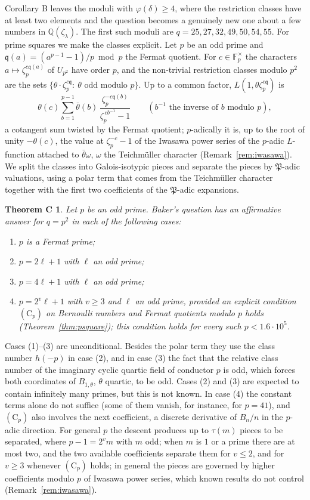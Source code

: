 \documentclass[11pt]{amsart}
\newtheorem*{mainC}{Theorem C}
\theoremstyle{definition}
\theoremstyle{remark}
\providecommand{\Q}{\mathbb Q}
\providecommand{\F}{\mathbb F}
\newcommand{\fq}{\mathfrak q}
\newcommand{\fP}{\mathfrak P}
\numberwithin{equation}{section}
\begin{document}
Corollary B leaves the moduli with $\varphi(\delta)\ge4$, where the restriction classes have at least two elements and the question becomes a genuinely new one about a few numbers in $\Q(\zeta_\lambda)$.
The first such moduli are $q=25,27,32,49,50,54,55$.
For prime squares we make the classes explicit.
Let $p$ be an odd prime and $\fq(a)=(a^{p-1}-1)/p\bmod p$ the Fermat quotient.
For $c\in\F_p^\times$ the characters $a\mapsto\zeta_p^{c\fq(a)}$ of $U_{p^2}$ have order $p$, and the non-trivial restriction classes modulo $p^2$ are the sets $\{\theta\cdot\zeta_p^{c\fq}:\ \theta \text{ odd modulo } p\}$.
Up to a common factor, $L(1,\theta\zeta_p^{c\fq})$ is
\[
\theta(c)\sum_{b=1}^{p-1}\bar\theta(b)\,\frac{\zeta_p^{-c\fq(b)}}{\zeta_p^{\,c b^{-1}}-1}\qquad(b^{-1}\text{ the inverse of $b$ modulo $p$}),
\]
a cotangent sum twisted by the Fermat quotient; $p$-adically it is, up to the root of unity $-\theta(c)$, the value at $\zeta_p^{-c}-1$ of the Iwasawa power series of the $p$-adic $L$-function attached to $\bar\theta\omega$, $\omega$ the Teichm\"uller character (Remark~\ref{rem:iwasawa}).
We split the classes into Galois-isotypic pieces and separate the pieces by $\fP$-adic valuations, using a polar term that comes from the Teichm\"uller character together with the first two coefficients of the $\fP$-adic expansions.

\begin{mainC}
Let $p$ be an odd prime. Baker's question has an affirmative answer for $q=p^2$ in each of the following cases:
\begin{enumerate}
\item $p$ is a Fermat prime;
\item $p=2\ell+1$ with $\ell$ an odd prime;
\item $p=4\ell+1$ with $\ell$ an odd prime;
\item $p=2^v\ell+1$ with $v\ge3$ and $\ell$ an odd prime, provided an explicit condition $(\mathrm C_p)$ on Bernoulli numbers and Fermat quotients modulo $p$ holds (Theorem~\ref{thm:psquare}); this condition holds for every such $p<1.6\cdot10^5$.
\end{enumerate}
\end{mainC}

Cases (1)--(3) are unconditional.
Besides the polar term they use the class number $h(-p)$ in case (2), and in case (3) the fact that the relative class number of the imaginary cyclic quartic field of conductor $p$ is odd, which forces both coordinates of $B_{1,\theta}$, $\theta$ quartic, to be odd.
Cases (2) and (3) are expected to contain infinitely many primes, but this is not known.
In case (4) the constant terms alone do not suffice (some of them vanish, for instance, for $p=41$), and $(\mathrm C_p)$ also involves the next coefficient, a discrete derivative of $B_n/n$ in the $p$-adic direction.
For general $p$ the descent produces up to $\tau(m)$ pieces to be separated, where $p-1=2^vm$ with $m$ odd; when $m$ is $1$ or a prime there are at most two, and the two available coefficients separate them for $v\le2$, and for $v\ge3$ whenever $(\mathrm C_p)$ holds; in general the pieces are governed by higher coefficients modulo $p$ of Iwasawa power series, which known results do not control (Remark~\ref{rem:iwasawa}).
\end{document}
